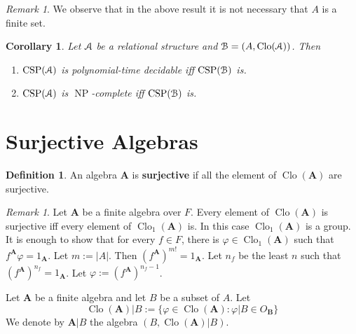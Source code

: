 \documentclass{amsart}
\theoremstyle{plain}
\newtheorem{corollary}[theorem]{Corollary}
\theoremstyle{definition}
\newtheorem{definition}[theorem]{Definition}
\theoremstyle{remark}
\newtheorem{remark}[theorem]{Remark}
\def\phi{\varphi}
\DeclareMathOperator{\Clo}{Clo}
\DeclareMathOperator{\CSP}{CSP}
\DeclareMathOperator{\NP}{NP}
\begin{document}
\begin{remark}
    We observe that in the above result it is not necessary that $A$ is a finite set. 
\end{remark}

\begin{corollary}
    Let $\EuScript{A}$ be a relational structure and $\EuScript{B}=(A, \Clo(\EuScript{A}))$. 
    Then 
    \begin{enumerate}
        \item $\CSP(\EuScript{A})$ is polynomial-time decidable iff $\CSP(\EuScript{B})$ is. 
        \item $\CSP(\EuScript{A})$ is $\NP$-complete iff $\CSP(\EuScript{B})$ is. 
    \end{enumerate}
    \begin{comment}
    \begin{proof}
        We prove that $\CSP(\EuScript{A})$ is polynomial-time equivalent to $\CSP(\EuScript{B})$. 
        Let $\EuScript{A}=(A,P)$. 
        Let $\Sigma$ be a finite set of atomic formulas over $P$. 

    \end{proof}
\end{comment}
\end{corollary}

\section{Surjective Algebras}

\begin{definition}
    An algebra $\mathbf{A}$ is \textbf{surjective} if all the element of $\Clo(\mathbf{A})$ are surjective. 
\end{definition}

\begin{remark}
    \label{surj_group}
    Let $\mathbf{A}$ be a finite algebra over $F$. 
    Every element of $\Clo(\mathbf{A})$ is surjective iff every element of $\Clo_1(\mathbf{A})$ is. 
    In this case $\Clo_1(\mathbf{A})$ is a group.
    It is enough to show that for every $f \in F$, there is $\phi \in \Clo_1(\mathbf{A})$ such that $f^\mathbf{A} \phi = 1_\mathbf{A}$. 
    Let $m:=|A|$. 
    Then $(f^{\mathbf{A}})^{m!}=1_\mathbf{A}$.
    Let $n_f$ be the least $n$ such that $(f^{\mathbf{A}})^{n_f}=1_\mathbf{A}$. 
    Let $\phi:=(f^{\mathbf{A}})^{n_f-1}$. 
\end{remark}

Let $\mathbf{A}$ be a finite algebra and let $B$ be a subset of $A$. 
Let 
\begin{equation*}
    \Clo(\mathbf{A})|B:=\{\phi \in \Clo(\mathbf{A}): \phi | B \in O_{\mathbf{B}} \}
\end{equation*} 
We denote by $\mathbf{A}|B$ the algebra $(B, \Clo(\mathbf{A})|B)$. 
\end{document}
